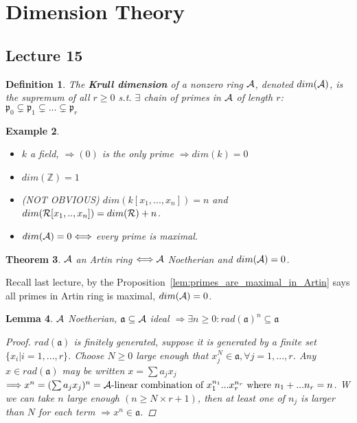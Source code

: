 \documentclass[11pt]{article}
\newtheorem{thm}{Theorem}[section]
\newtheorem{lemma}[thm]{Lemma}
\newtheorem{dfn}[thm]{Definition}
\newtheorem{ex}[thm]{Example}
\newcommand{\intg}{\mathbb Z}
\newcommand{\sca}{{\mathfrak a}}
\newcommand{\scp}{{\mathfrak p}}
\newcommand{\cala}{{\cal A}}
\newcommand{\calr}{{\cal R}}
\newcommand{\Lrta}{\Longrightarrow}
\newcommand{\Llrta}{\Longleftrightarrow}
\begin{document}
\section{Dimension Theory}

\subsection{Lecture 15}
\begin{dfn}
The \textbf{Krull dimension} of a nonzero ring $\cala$, denoted $dim(\cala)$, is the supremum of all $r\geq 0$ s.t. $\exists$ chain of primes in $\cala$ of length $r$: 
$\scp_0\subsetneq \scp_1\subsetneq...\subsetneq \scp_r$
\end{dfn}

\begin{ex}\ 
\begin{itemize}
\item $k$ a field, $\Lrta (0)$ is the only prime $\Lrta dim(k)=0$
\item $dim(\intg)=1$
\item (NOT OBVIOUS) $dim(k[x_1,...,x_n])=n$
 and $dim(\calr[x_1,..,x_n])=dim(\calr)+n$.
\item $dim(\cala)=0\Llrta $ every prime is maximal.  
\end{itemize}
\end{ex}

\begin{thm}\label{thm:Artin_equiv_Noetherin+dim=0}
$\cala$ an Artin ring $\Llrta\cala$ Noetherian and $dim(\cala)=0$.  
\end{thm}
Recall last lecture, by the Proposition~\ref{lem:primes_are_maximal_in_Artin} says all primes in Artin ring is maximal, $dim(\cala)=0$.

\begin{lemma}\label{lem:ideal_radical_Noetherian}
$\cala$ Noetherian, $\sca\subseteq \cala$ ideal $\Lrta \exists n\geq 0: rad(\sca)^n\subseteq \sca$
\begin{proof}
$rad(\sca)$ is finitely generated, suppose it is generated by a finite set $\{x_i|i=1,...,r\}$. Choose $N\geq 0$ large enough that $x_j^N\in\sca,\forall j=1,...,r$. Any $x\in rad(\sca)$ may be written $x=\sum a_j x_j$ $\Lrta x^n=(\sum a_j x_j)^n=\cala\text{-linear combination of $x_1^{n_1}...x_r^{n_r} $ where $n_1+...n_r=n$}$. W we can take $n$ large enough $(n\geq N\times r+1)$, then at least one of $n_j$ is larger than $N$ for each term $\Lrta x^n\in\sca$.
\end{proof}
\end{lemma}
\end{document}
